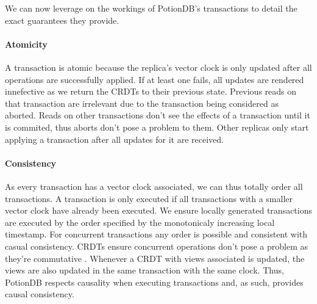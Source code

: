 \documentclass{vldb}
\begin{document}
We can now leverage on the workings of PotionDB's transactions to detail the exact guarantees they provide.


\paragraph{Atomicity}  A transaction is atomic because the replica's vector clock is only updated after all operations are successfully applied. 
If at least one fails, all updates are rendered innefective as we return the CRDTs to their previous state.
Previous reads on that transaction are irrelevant due to the transaction being considered as aborted.
Reads on other transactions don't see the effects of a transaction until it is commited, thus aborts don't pose a problem to them.
Other replicas only start applying a transaction after all updates for it are received.

\paragraph{Consistency} As every transaction has a vector clock associated, we can thus totally order all transactions. 
A transaction is only executed if all transactions with a smaller vector clock have already been executed. 
We ensure locally generated transactions are executed by the order specified by the monotonicaly increasing local timestamp.
For concurrent transactions any order is possible and consistent with casual consistency.
CRDTs ensure concurrent operations don't pose a problem as they're commutative \cite{???}.
Whenever a CRDT with views associated is updated, the views are also updated in the same transaction with the same clock.
Thus, PotionDB respects causality when executing transactions and, as such, provides causal consistency.
\end{document}
